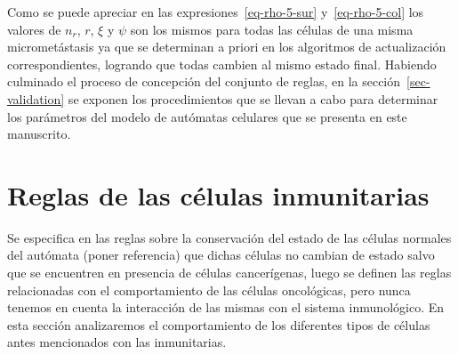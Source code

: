 Como se puede apreciar en las expresiones~\ref{eq-rho-5-sur} y~\ref{eq-rho-5-col} los valores de $n_r$, $r$, $\xi$ y $\psi$ son los mismos para todas las c\'elulas de una misma micromet\'astasis ya que se determinan a priori en los algoritmos de actualizaci\'on correspondientes, logrando que todas cambien al mismo estado final. Habiendo culminado el proceso de concepci\'on del conjunto de reglas, en la secci\'on~\ref{sec-validation} se exponen los procedimientos que se llevan a cabo para determinar los par\'ametros del modelo de aut\'omatas celulares que se presenta en este manuscrito. 









\section{Reglas de las c\'elulas inmunitarias}

Se especifica en las reglas sobre la conservaci\'on del estado de las c\'elulas normales del aut\'omata (poner referencia) que dichas c\'elulas no cambian de estado salvo que se encuentren en presencia de c\'elulas cancerígenas, luego se definen las reglas relacionadas con el comportamiento de las c\'elulas oncol\'ogicas, pero nunca tenemos en cuenta la interacci\'on de las mismas con el sistema inmunológico. En esta sección analizaremos el comportamiento de los diferentes tipos de c\'elulas antes mencionados con las inmunitarias.

